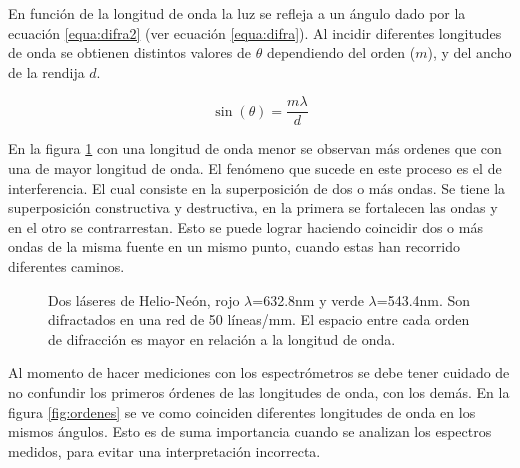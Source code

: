 En función de la longitud de onda la luz se refleja a un ángulo dado por la ecuación \ref{equa:difra2} (ver ecuación \ref{equa:difra}). Al incidir diferentes longitudes de onda se obtienen distintos valores de $\theta$ dependiendo del orden ($m$), y del ancho de la rendija $d$. 

\begin{equation}
\sin(\theta) = \frac{m \lambda}{d}
\label{equa:difra2}
\end{equation}

En la figura \ref{fig:difracro} con una longitud de onda menor se observan más ordenes que con una de mayor longitud de onda. 
El fenómeno que sucede en este proceso es el de interferencia. El cual consiste en la superposición de dos o más ondas. Se tiene la superposición constructiva y destructiva, en la primera se fortalecen las ondas y en el otro se contrarrestan. Esto se puede lograr haciendo coincidir dos o más ondas de la misma fuente en un mismo punto, cuando estas han recorrido diferentes caminos.


\begin{figure}
	\centering
	\caption[Difracción de la luz con diferentes longitudes de onda.]{Dos láseres de Helio-Neón, rojo $\lambda$=632.8nm y verde $\lambda$=543.4nm. Son difractados en una red de 50 líneas/mm. El espacio entre cada orden de difracción es mayor en relación a la longitud de onda. \cite{laserGR}}
	\label{fig:difracro}
\end{figure}
Al momento de hacer mediciones con los espectrómetros se debe tener cuidado de no confundir los primeros órdenes de las longitudes de onda, con los demás. En la figura \ref{fig:ordenes} se ve como coinciden diferentes longitudes de onda en los mismos ángulos. Esto es de suma importancia cuando se analizan los espectros medidos, para evitar una interpretación incorrecta.

